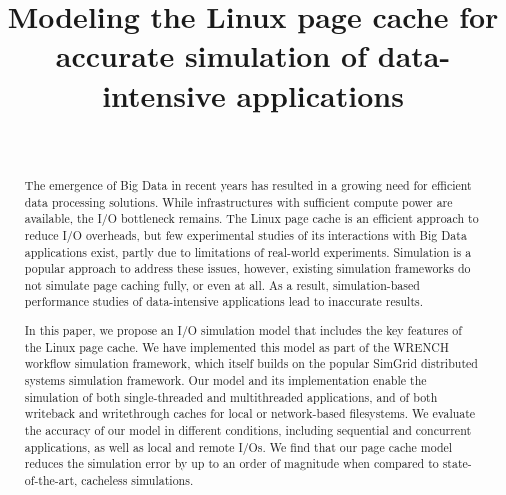\documentclass[conference]{IEEEtran}
\newcommand{\simgrid}{SimGrid\xspace}
\newcommand{\wrench}{WRENCH\xspace}
\begin{document}
\title{Modeling the Linux page cache for accurate simulation of data-intensive applications}

\author{
  \\
}

\maketitle

    \begin{abstract}

    The emergence of Big Data in recent years has resulted in a growing
    need for efficient data processing solutions. While infrastructures
    with sufficient compute power are available,
    the I/O bottleneck remains. The Linux page cache is an efficient
    approach to reduce I/O overheads, but few
    experimental studies of its interactions with Big Data applications exist,
    partly due to limitations of
    real-world experiments. Simulation is a popular approach to address
    these issues, however, existing simulation frameworks do not simulate
    page caching fully, or even at all.  As a result, simulation-based
    performance studies of data-intensive applications lead to inaccurate
    results.

    In this paper, we propose an I/O simulation model that includes
    the key features of the Linux page cache. We have implemented this model
    as part of the \wrench workflow simulation framework, which itself
    builds on the popular \simgrid distributed systems simulation
    framework. Our model and its implementation enable the simulation
    of both single-threaded and multithreaded applications, and of both
    writeback and writethrough caches for local or network-based
    filesystems. We evaluate the accuracy of our model in different
    conditions, including sequential and concurrent applications, as
    well as local and remote I/Os. We find that our page cache model
    reduces the simulation error by up to an order of magnitude when
    compared to state-of-the-art, cacheless simulations.

    \end{abstract}
\end{document}
